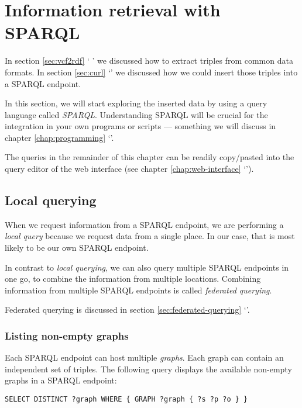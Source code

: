 \chapter{Information retrieval with SPARQL}

  In section \ref{sec:vcf2rdf} {\color{LinkGray}`%
  '} we discussed how to extract triples from common data
  formats.  In section \ref{sec:curl} {\color{LinkGray}`'} we
  discussed how we could insert those triples into a SPARQL endpoint.

  In this section, we will start exploring the inserted data by using a
  query language called \emph{SPARQL}.  Understanding SPARQL will be crucial
  for the integration in your own programs or scripts --- something we will
  discuss in chapter \ref{chap:programming} {\color{LinkGray}%
  `'}.

  The queries in the remainder of this chapter can be readily copy/pasted into
  the query editor of the web interface (see chapter \ref{chap:web-interface}
  {\color{LinkGray}`'}).

\section{Local querying}

  When we request information from a SPARQL endpoint, we are performing a
  \emph{local query} because we request data from a single place.  In our case,
  that is most likely to be our own SPARQL endpoint.

  In contrast to \emph{local querying}, we can also query multiple SPARQL
  endpoints in one go, to combine the information from multiple locations.
  Combining information from multiple SPARQL endpoints is called \emph{federated
    querying}.

  Federated querying is discussed in section \ref{sec:federated-querying}
  {\color{LinkGray}`'}.

\subsection{Listing non-empty graphs}
\label{sec:non-empty-graphs}
  Each SPARQL endpoint can host multiple \emph{graphs}.  Each graph can contain
  an independent set of triples.  The following query displays the available
  non-empty graphs in a SPARQL endpoint:

\begin{siderules}
\begin{verbatim}
SELECT DISTINCT ?graph WHERE { GRAPH ?graph { ?s ?p ?o } }
\end{verbatim}
\end{siderules}

